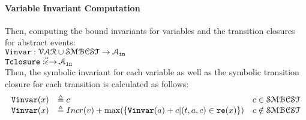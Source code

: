 %
\paragraph*{Variable Invariant Computation}
Then, computing the bound invariants for variables and the transition closures for abstract events:
\\ 
$ {\mathtt{Vinvar}}: \mathcal{VAR} \cup \mathcal{SMBCST} \to \mathcal{A}_{\mathtt{in}}$
\\
${\mathtt{Tclosure}}: \stackrel{\scriptscriptstyle{\alpha}}{\mathtt{\epsilon}{}} \to \mathcal{A}_{\mathtt{in}}$
\\
Then, the symbolic invariant for each variable 
as well as the symbolic transition closure for each transition is calculated as follows:
\[ 
\begin{array}{lll}
  {\ensuremath{\mathtt{Vinvar}}}(x) & \triangleq c & c \in \mathcal{SMBCST} \\
  {\mathtt{Vinvar}}(x) & \triangleq Incr(v) + \max(\{{\mathtt{Vinvar}}(a) + c | (t, a, c) \in \mathtt{re}(x)\}) & c \notin \mathcal{SMBCST}
\end{array}
\]
%
%
